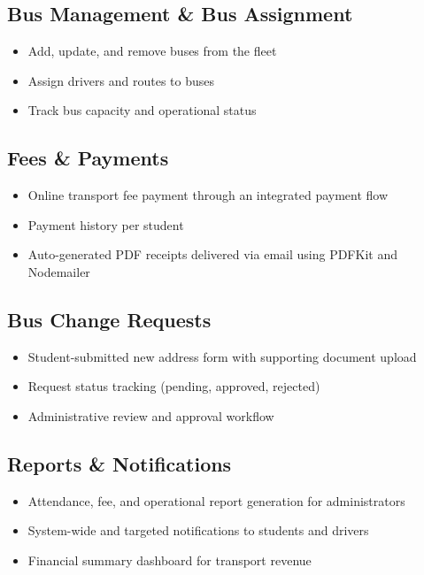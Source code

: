 \documentclass[11pt,a4paper]{report}
\begin{document}
\subsection{Bus Management \& Bus Assignment}
\begin{itemize}[leftmargin=1.3em]
  \item Add, update, and remove buses from the fleet
  \item Assign drivers and routes to buses
  \item Track bus capacity and operational status
\end{itemize}

\subsection{Fees \& Payments}
\begin{itemize}[leftmargin=1.3em]
  \item Online transport fee payment through an integrated payment flow
  \item Payment history per student
  \item Auto-generated PDF receipts delivered via email using PDFKit and Nodemailer
\end{itemize}

\subsection{Bus Change Requests}
\begin{itemize}[leftmargin=1.3em]
  \item Student-submitted new address form with supporting document upload
  \item Request status tracking (pending, approved, rejected)
  \item Administrative review and approval workflow
\end{itemize}

\subsection{Reports \& Notifications}
\begin{itemize}[leftmargin=1.3em]
  \item Attendance, fee, and operational report generation for administrators
  \item System-wide and targeted notifications to students and drivers
  \item Financial summary dashboard for transport revenue
\end{itemize}
\end{document}
